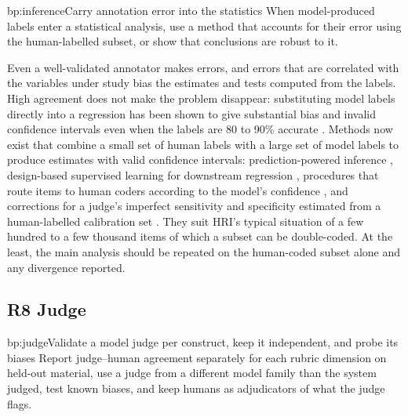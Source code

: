 \begin{practice}{bp:inference}{Carry annotation error into the statistics}
When model-produced labels enter a statistical analysis, use a method that
accounts for their error using the human-labelled subset, or show that
conclusions are robust to it.
\end{practice}

Even a well-validated annotator makes errors, and errors that are correlated
with the variables under study bias the estimates and tests computed from the
labels. High agreement does not make the problem disappear: substituting
model labels directly into a regression has been shown to give substantial
bias and invalid confidence intervals even when the labels are 80 to 90\%
accurate \cite{egami2023using}. Methods now exist
that combine a small set of human labels with a large set of model labels to
produce estimates with valid confidence intervals: prediction-powered
inference \cite{angelopoulos2023prediction}, design-based supervised learning
for downstream regression \cite{egami2023using}, procedures that route
items to human coders according to the model's confidence
\cite{gligoric2025can}, and corrections for a judge's imperfect sensitivity
and specificity estimated from a human-labelled calibration set
\cite{lee2026how}. They suit HRI's typical situation of a few hundred to
a few thousand items of which a subset can be double-coded. At the least, the
main analysis should be repeated on the human-coded subset alone and any
divergence reported.

\subsection{R8 Judge}

\begin{practice}{bp:judge}{Validate a model judge per construct, keep it independent, and probe its biases}
Report judge--human agreement separately for each rubric dimension on
held-out material, use a judge from a different model family than the system
judged, test known biases, and keep humans as adjudicators of what the judge
flags.
\end{practice}

